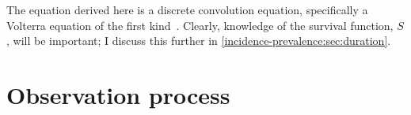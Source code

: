 \documentclass[thesis.tex]{subfiles}
\begin{document}

The equation derived here is a discrete convolution equation, specifically a Volterra equation of the first kind~\autocite{brookmeyerBackcalculation}.
Clearly, knowledge of the survival function, $S$, will be important; I discuss this further in \cref{incidence-prevalence:sec:duration}.

\section{Observation process} \label{incidence-prevalence:sec:observation-process}

\end{document}
